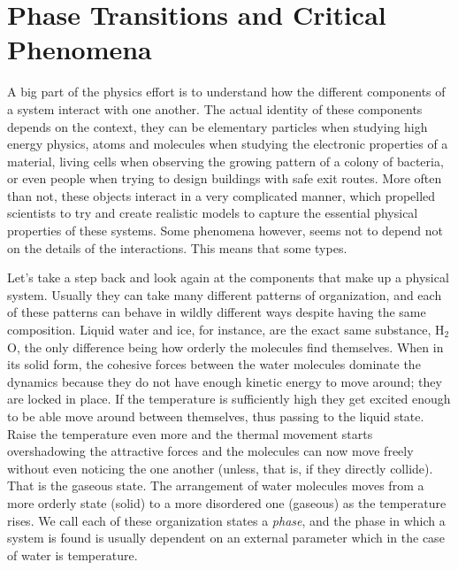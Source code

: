 \chapter{Phase Transitions and Critical Phenomena}
\label{ch2-crit}



A big part of the physics effort is to understand how the different components
of a system interact with one another. The actual identity of these components
depends on the context, they can be elementary particles when studying high
energy physics, atoms and molecules when studying the electronic properties of
a material, living cells when observing the growing pattern of a colony of
bacteria, or even people when trying to design buildings with safe exit routes.
More often than not, these objects interact in a very complicated manner, which
propelled scientists to try and create realistic models to capture the
essential physical properties of these systems. Some phenomena however, seems
not to depend not on the details of the interactions. This means that some
types.

Let's take a step back and look again at the components that make up a physical
system. Usually they can take many different patterns of organization, and each
of these patterns can behave in wildly different ways despite having the same
composition. Liquid water and ice, for instance, are the exact same substance,
H${}_2$O, the only difference being how orderly the molecules find themselves.
When in its solid form, the cohesive forces between the water molecules
dominate the dynamics because they do not have enough kinetic energy to move
around; they are locked in place. If the temperature is sufficiently high they
get excited enough to be able move around between themselves, thus passing to
the liquid state. Raise the temperature even more and the thermal movement
starts overshadowing the attractive forces and the molecules can now move
freely without even noticing the one another (unless, that is, if they directly
collide). That is the gaseous state. The arrangement of water molecules moves
from a more orderly state (solid) to a more disordered one (gaseous) as the
temperature rises. We call each of these organization states a \textit{phase},
and the phase in which a system is found is usually dependent on an external
parameter which in the case of water is temperature.

